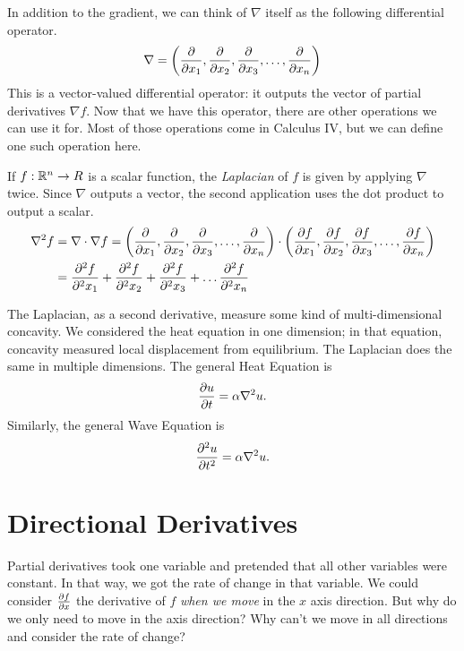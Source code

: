 \documentclass[fleqn,letterpaper]{report}
\begin{document}
In addition to the gradient, we can think of $\nabla$ itself
as the following differential operator.
\begin{equation*}
\nabla = \left( 
\frac{\partial}{\partial x_1}, 
\frac{\partial}{\partial x_2}, 
\frac{\partial}{\partial x_3}, \ldots, 
\frac{\partial}{\partial x_n} \right) 
\end{equation*}
This is a vector-valued differential operator: it outputs the
vector of partial derivatives $\nabla f$. Now that
we have this operator, there are other operations we can use
it for. Most of those operations come in Calculus IV, but we
can define one such operation here. 

\begin{defn}
If $f: \mathbb{R}^n \rightarrow R$ is a scalar function, the
\emph{Laplacian} of $f$ is given by applying $\nabla$ twice.
Since $\nabla$ outputs a vector, the second application uses
the dot product to output a scalar. 
\begin{align*}
\nabla^2 f & = \nabla \cdot \nabla f = \left( 
\frac{\partial}{\partial x_1}, 
\frac{\partial}{\partial x_2}, 
\frac{\partial}{\partial x_3}, \ldots, 
\frac{\partial}{\partial x_n} \right) 
\cdot \left( \frac{\partial f}{\partial x_1}, 
\frac{\partial f}{\partial x_2}, 
\frac{\partial f}{\partial x_3}, \ldots, 
\frac{\partial f}{\partial x_n} \right) \\
& = 
\frac{\partial^2 f}{\partial^2 x_1} + 
\frac{\partial^2 f}{\partial^2 x_2} +
\frac{\partial^2 f}{\partial^2 x_3} + \ldots 
\frac{\partial^2 f}{\partial^2 x_n} 
\end{align*}
\end{defn}

The Laplacian, as a second derivative, measure some kind of
multi-dimensional concavity. We considered the heat equation
in one dimension; in that equation, concavity measured local
displacement from equilibrium. The Laplacian does the same in
multiple dimensions. The general Heat Equation is
\begin{equation*}
\frac{\partial u}{\partial t} = \alpha \nabla^2 u.
\end{equation*}
Similarly, the general Wave Equation is
\begin{equation*}
\frac{\partial^2 u}{\partial t^2} = \alpha \nabla^2 u.
\end{equation*}

\section{Directional Derivatives}
\label{directional-derivatives}

Partial derivatives took one variable and pretended that all
other variables were constant. In that way, we got the rate of
change in that variable. We could consider $\frac{\partial f}{\partial
x}$ the derivative of $f$ \emph{when we move} in the $x$ axis 
direction. But why do we only need to move in the axis
direction? Why can't we move in all directions and consider
the rate of change?
\end{document}
